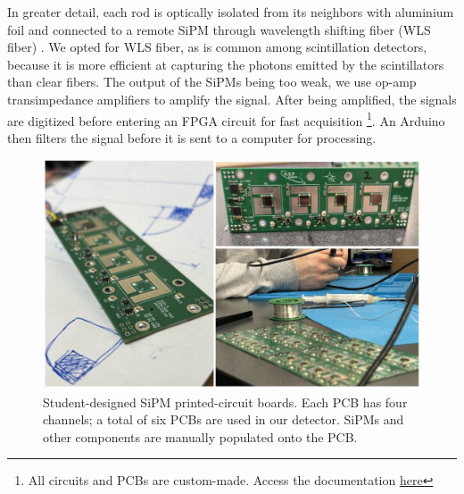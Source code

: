 \vspace{10mm}
In greater detail, each rod is optically isolated from its neighbors with aluminium foil and connected to a remote SiPM through wavelength shifting fiber (WLS fiber)\cite{wls} . We opted for WLS fiber, as is common among scintillation detectors, because it is more efficient at capturing the photons emitted by the scintillators than clear fibers. The output of the SiPMs being too weak, we use op-amp transimpedance amplifiers to amplify the signal. After being amplified, the signals are digitized before entering an FPGA circuit for fast acquisition \footnote{All circuits and PCBs are custom-made. Access the documentation \href{https://github.com/ThatAquarel/hep/tree/main/scintillator_field/hardware/docs}{\underline{here}}}. An Arduino then filters the signal before it is sent to a computer for processing.


\begin{figure}[h]
    \centering
    \includegraphics[scale=0.28]{figures/fig2.JPG}
\caption{Student-designed SiPM printed-circuit boards. Each PCB has four channels; a total of six PCBs are used in our detector. SiPMs and other components are manually populated onto the PCB.}
\label{fig2}
\end{figure}

